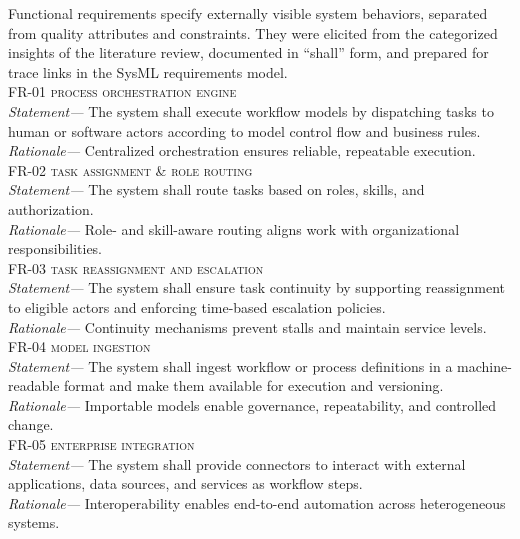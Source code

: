Functional requirements specify externally visible system behaviors, separated from quality attributes and constraints. They were elicited from the categorized insights of the literature review, documented in “shall” form, and prepared for trace links in the SysML requirements model. \\

\noindent \textsc{FR-01 process orchestration engine} \\
\indent \emph{Statement—} The system shall execute workflow models by dispatching tasks to human or software actors according to model control flow and business rules. \\
\indent \emph{Rationale—} Centralized orchestration ensures reliable, repeatable execution. \\

\noindent \textsc{FR-02 task assignment \& role routing} \\
\indent \emph{Statement—} The system shall route tasks based on roles, skills, and authorization. \\
\indent \emph{Rationale—} Role- and skill-aware routing aligns work with organizational responsibilities. \\

\noindent \textsc{FR-03 task reassignment and escalation} \\
\indent \emph{Statement—} The system shall ensure task continuity by supporting reassignment to eligible actors and enforcing time-based escalation policies. \\
\indent \emph{Rationale—} Continuity mechanisms prevent stalls and maintain service levels. \\

\noindent \textsc{FR-04 model ingestion} \\
\indent \emph{Statement—} The system shall ingest workflow or process definitions in a machine-readable format and make them available for execution and versioning. \\
\indent \emph{Rationale—} Importable models enable governance, repeatability, and controlled change. \\

\noindent \textsc{FR-05 enterprise integration} \\
\indent \emph{Statement—} The system shall provide connectors to interact with external applications, data sources, and services as workflow steps. \\
\indent \emph{Rationale—} Interoperability enables end-to-end automation across heterogeneous systems. \\

